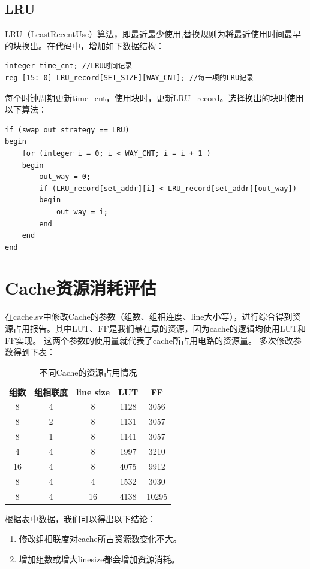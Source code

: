 \documentclass{ctexart}
\begin{document}
\subsection{\hei LRU}
LRU（Least\space Recent\space Use）算法，即最近最少使用,替换规则为将最近使用时间最早的块换出。在代码中，增加如下数据结构：
\begin{lstlisting}
integer time_cnt; //LRU时间记录
reg [15: 0] LRU_record[SET_SIZE][WAY_CNT]; //每一项的LRU记录
\end{lstlisting}
\par 每个时钟周期更新time\_cnt，使用块时，更新LRU\_record。选择换出的块时使用以下算法：
\begin{lstlisting}
if (swap_out_strategy == LRU)
begin
    for (integer i = 0; i < WAY_CNT; i = i + 1 )
    begin
        out_way = 0;
        if (LRU_record[set_addr][i] < LRU_record[set_addr][out_way])
        begin
            out_way = i;
        end
    end
end
\end{lstlisting}
\section{\hei Cache资源消耗评估}

在cache.sv中修改Cache的参数（组数、组相连度、line大小等），进行综合得到资源占用报告。其中LUT、FF是我们最在意的资源，因为cache的逻辑均使用LUT和FF实现。
这两个参数的使用量就代表了cache所占用电路的资源量。
多次修改参数得到下表：
\begin{table}[H]
    \centering
    \begin{tabular}{ccccc}
        \textbf{组数} & \textbf{组相联度} & \textbf{line size} & \textbf{LUT} & \textbf{FF} \\
        8             & 4                 & 8                  & 1128         & 3056        \\
        8             & 2                 & 8                  & 1131         & 3057        \\
        8             & 1                 & 8                  & 1141         & 3057        \\
        4             & 4                 & 8                  & 1997         & 3210        \\
        16            & 4                 & 8                  & 4075         & 9912        \\
        8             & 4                 & 4                  & 1532         & 3030        \\
        8             & 4                 & 16                 & 4138         & 10295
    \end{tabular}
    \caption{不同Cache的资源占用情况}
\end{table}
\par 根据表中数据，我们可以得出以下结论：
\begin{enumerate}
    \item 修改组相联度对cache所占资源数变化不大。
    \item 增加组数或增大line\space size都会增加资源消耗。
\end{enumerate}
\end{document}

